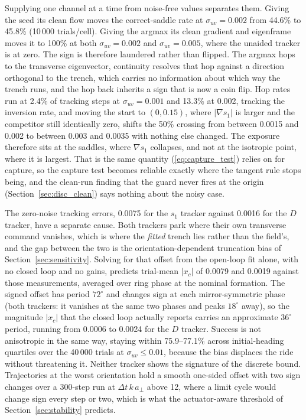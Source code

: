 \documentclass[lettersize,journal]{IEEEtran}
\begin{document}
Supplying one channel at a time from noise-free values separates them.
Giving the seed its clean flow moves the correct-saddle rate at
$\sigma_{uv} = 0.002$ from 44.6\% to 45.8\% (10\,000 trials/cell). Giving
the argmax its clean gradient and eigenframe moves it to 100\% at both
$\sigma_{uv} = 0.002$ and $\sigma_{uv} = 0.005$, where the unaided tracker
is at zero. The sign is therefore
laundered rather than flipped. The argmax hops to the transverse
eigenvector, continuity resolves that hop against a direction orthogonal
to the trench, which carries no information about which way the trench
runs, and the hop back inherits a sign that is now a coin flip. Hop rates
run at 2.4\% of tracking steps at $\sigma_{uv} = 0.001$ and 13.3\% at
0.002, tracking the inversion rate, and moving the start to $(0, 0.15)$,
where $|\nabla s_1|$ is larger and the competitor still identically zero,
shifts the 50\% crossing from between 0.0015 and 0.002 to between 0.003
and 0.0035 with nothing else changed. The exposure therefore sits at the
saddles, where $\nabla s_1$ collapses, and not at the isotropic point,
where it is largest. That is the same quantity
(\ref{eq:capture_test}) relies on for capture, so the capture test
becomes reliable exactly where the tangent rule stops being, and the
clean-run finding that the guard never fires at the origin
(Section~\ref{sec:disc_clean}) says nothing about the noisy case.

The zero-noise tracking errors, 0.0075 for the $s_1$ tracker against
0.0016 for the $D$ tracker, have a separate cause. Both trackers park
where their own transverse command vanishes, which is where the
\emph{fitted} trench lies rather than the field's, and the gap between
the two is the orientation-dependent truncation bias of
Section~\ref{sec:sensitivity}. Solving for that offset from the
open-loop fit alone, with no closed loop and no gains, predicts
trial-mean $|x_c|$ of 0.0079 and 0.0019 against those measurements,
averaged over ring phase at the nominal formation. The signed offset has
period $72^\circ$ and changes sign at each mirror-symmetric phase (both
trackers: it vanishes at the same two phases and peaks $18^\circ$ away),
so the magnitude $|x_c|$ that the closed loop actually reports carries an
approximate $36^\circ$ period, running from 0.0006 to 0.0024 for the $D$
tracker. Success is not anisotropic in the same way, staying within
75.9--77.1\% across initial-heading quartiles over the 40\,000 trials at
$\sigma_{uv} \leq 0.01$, because the bias displaces the ride without
threatening it. Neither tracker shows the signature of the discrete
bound. Trajectories at the worst orientation hold a smooth one-sided
offset with two sign changes over a 300-step run at $\Delta t\,k\,a_\perp$
above 12, where a limit cycle would change sign every step or two, which
is what the actuator-aware threshold of Section~\ref{sec:stability}
predicts.
\end{document}
